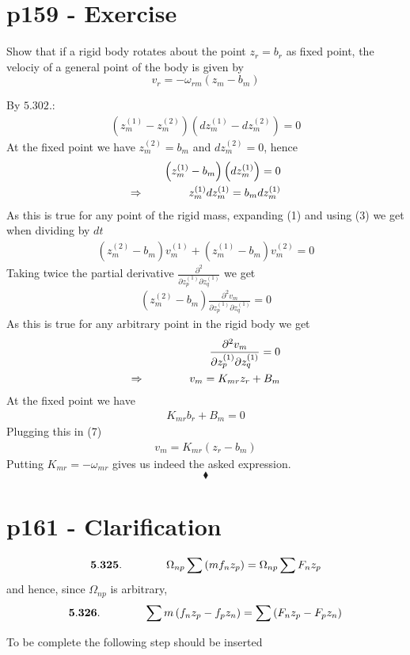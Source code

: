 \section{p159 - Exercise}
\begin{tcolorbox}
Show that if a rigid body rotates about the point $z_r=b_r$ as fixed point, the velociy of a general point of the body is given by $$v_r=-\omega_{rm}\left(z_m-b_m\right)$$
\end{tcolorbox}
By $\mathbf{5.302. }$:
\begin{align}
\left(z^{(1)}_m-z^{(2)}_m\right)\left(dz^{(1)}_m-dz^{(2)}_m\right)=0
\end{align}
At the fixed point we have $z^{(2)}_m=b_m$ and $dz^{(2)}_m=0$, hence
\begin{align}
\left(z^{(1)}_m-b_m\right)\left(dz^{(1)}_m\right)=0\\
\Rightarrow\quad\quad\quad\quad z^{(1)}_mdz^{(1)}_m =b_mdz^{(1)}_m
\end{align}
As this is true for any point of the rigid mass, expanding (1) and using (3) we get when dividing by $dt$
\begin{align}
\left(z^{(2)}_m-b_m\right)v^{(1)}_m+\left(z^{(1)}_m-b_m\right)v^{(2)}_m=0
\end{align}
Taking twice the partial derivative $\frac{\partial^2}{\partial z^{(1)}_p\partial z^{(1)}_q}$ we get
\begin{align}
\left(z^{(2)}_m-b_m\right)\frac{\partial^2 v_m}{\partial z^{(1)}_p\partial z^{(1)}_q}=0
\end{align}
As this is true for any arbitrary point in the rigid body we get
\begin{align}
\frac{\partial^2 v_m}{\partial z^{(1)}_p\partial z^{(1)}_q}=0\\
\Rightarrow\quad\quad\quad\quad v_m= K_{mr}z_r+B_m
\end{align}
At the fixed point we have 
\begin{align}
 K_{mr}b_r+B_m =0
\end{align}
Plugging this in (7)
\begin{align}
 v_m= K_{mr}\left(z_r-b_m\right)
\end{align}
Putting $K_{mr}=-\omega_{mr}$ gives us indeed the asked expression.
$$\blacklozenge$$
\newpage


\section{p161 - Clarification}
\begin{tcolorbox}
$$\mathbf{5.325.}\quad\quad\quad\quad \Omega_{np}\sum \left(mf_nz_p\right)= \Omega_{np}\sum F_nz_p $$
and hence, since $\Omega_{np}$ is arbitrary,
$$\mathbf{5.326.}\quad\quad\quad\quad \sum m\left(f_nz_p-f_pz_n\right)= \sum \left(F_nz_p-F_pz_n \right)$$
\end{tcolorbox}
To be complete the following step should be inserted

